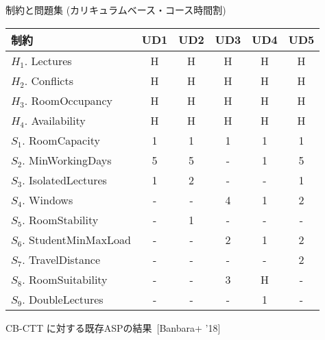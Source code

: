 \documentclass[11pt,dvipdfmx]{beamer}
\newcommand{\backupend}{
   \addtocounter{framenumberappendix}{-\value{framenumber}}
   \addtocounter{framenumber}{\value{framenumberappendix}} 
}
\begin{document}
\begin{frame}{制約と問題集 (カリキュラムベース・コース時間割)}
  \begin{block}{}\small
    \begin{center}
      \begin{tabular}{l|ccccc}%
        制約                      &  UD1  &  UD2  &  UD3  &  UD4  &  UD5  \\
        \hline
        $H_1$. Lectures           &  H    &  H    &  H    &  H    &  H    \\
        $H_2$. Conflicts          &  H    &  H    &  H    &  H    &  H    \\
        $H_3$. RoomOccupancy      &  H    &  H    &  H    &  H    &  H    \\
        $H_4$. Availability       &  H    &  H    &  H    &  H    &  H    \\
        $S_1$. RoomCapacity       &  1    &  1    &  1    &  1    &  1    \\
        $S_2$. MinWorkingDays     &  5    &  5    &  -    &  1    &  5    \\
        $S_3$. IsolatedLectures   &  1    &  2    &  -    &  -    &  1    \\
        $S_4$. Windows            &  -    &  -    &  4    &  1    &  2    \\
        $S_5$. RoomStability      &  -    &  1    &  -    &  -    &  -    \\
        $S_6$. StudentMinMaxLoad  &  -    &  -    &  2    &  1    &  2    \\
        $S_7$. TravelDistance     &  -    &  -    &  -    &  -    &  2    \\
        $S_8$. RoomSuitability    &  -    &  -    &  3    &  H    &  -    \\
        $S_9$. DoubleLectures     &  -    &  -    &  -    &  1    &  -  
      \end{tabular}
    \end{center}
  \end{block}
\end{frame}
\begin{frame}{CB-CTT に対する既存ASPの結果~[Banbara+ '18]}
  \centering
  \scriptsize
  \begin{tableC}
    
  \end{tableC}
\end{frame}
\backupend
\end{document}
